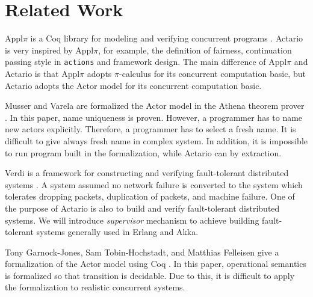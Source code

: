 \section{Related Work}

Appl\(\pi\) is a Coq library for modeling and verifying concurrent programs \cite{Affeldt200817}.
Actario is very inspired by Appl\(\pi\), for example, the definition of fairness, continuation passing style in \texttt{actions} and framework design.
The main difference of Appl\(\pi\) and Actario is that Appl\(\pi\) adopts \(\pi\)-calculus for its concurrent computation basic, but Actario adopts the Actor model for its concurrent computation basic.

Musser and Varela are formalized the Actor model in the Athena theorem prover \cite{Athena}\cite{Musser:2013aa}. %
In this paper, name uniqueness is proven.
However, a programmer has to name new actors explicitly.
Therefore, a programmer has to select a fresh name. It is difficult to give always fresh name in complex system.
In addition, it is impossible to run program built in the formalization, while Actario can by extraction.

Verdi is a framework for constructing and verifying fault-tolerant distributed systems \cite{Verdi}.
A system assumed no network failure is converted to the system which tolerates dropping packets, duplication of packets, and machine failure.
One of the purpose of Actario is also to build and verify fault-tolerant distributed systems.
We will introduce \textit{supervisor} mechanism to achieve building fault-tolerant systems generally used in Erlang and Akka.


Tony Garnock-Jones, Sam Tobin-Hochstadt, and Matthias Felleisen give a formalization of the Actor model using Coq \cite{Garnock-Jones:2014aa}.
In this paper, operational semantics is formalized so that transition is decidable.
Due to this, it is difficult to apply the formalization to realistic concurrent systems.
